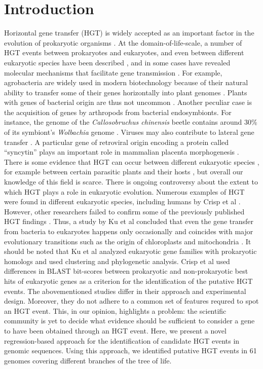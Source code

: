 \section{Introduction}
\label{intro}
Horizontal gene transfer (HGT) is widely accepted as an important factor in the
evolution of prokaryotic organisms \cite{Ochman2000}. At the
domain-of-life-scale, a number of HGT events between prokaryotes and
eukaryotes, and even between different eukaryotic species have been
described \cite{Danchin2016a},
and in some cases have revealed molecular mechanisms that
facilitate gene transmission \cite{Soucy2015}. For example, agrobacteria are
widely used in modern biotechnology because of their natural ability to
transfer some of their genes horizontally into plant genomes
\cite{Chilton1977}. Plants with genes of bacterial origin are thus not uncommon
\cite{Kyndt2015, Matveeva2012, Matveeva2014}. Another peculiar case is the
acquisition of genes by arthropods from bacterial endosymbionts. For instance,
the genome of the \textit{Callosobruchus chinensis} beetle contains around 30\%
of its symbiont's \textit{Wolbachia} genome \cite{Nikoh2008}. Viruses may also
contribute to lateral gene transfer \cite{Drezen2017}. A particular gene of
retroviral origin encoding a protein called ``syncytin'' plays an important
role in mammalian placenta morphogenesis \cite{Mi2000}. There is some evidence
that HGT can occur between different eukaryotic species \cite{Soucy2015}, for
example between certain parasitic plants and their hosts \cite{Yoshida2010,
Xi2012, Zhang2013, Zhang2014}, but overall our knowledge of this field is
scarce. There is ongoing controversy about the extent to which HGT plays a role
in eukaryotic evolution. Numerous examples of HGT were found in different
eukaryotic species, including humans by Crisp et al \cite{Crisp2015}. However,
other researchers failed to confirm some of the previously published HGT
findings \cite{Salzberg2017}. Thus, a study by Ku et al concluded that even the
gene transfer from bacteria to eukaryotes happens only occasionally and
coincides with major evolutionary transitions such as the origin of
chloroplasts and mitochondria \cite{Ku2015}. It should be noted that Ku et al
analyzed eukaryotic gene families with prokaryotic homologs and used clustering
and phylogenetic analysis. Crisp et al used differences in BLAST bit-scores
between prokaryotic and non-prokaryotic best hits of eukaryotic genes as a
criterion for the identification of the putative HGT events. The abovementioned
studies differ in their approach and experimental design. Moreover, they do not
adhere to a common set of features requred to spot an HGT event. This, in our
opinion, highlights a problem: the scientific community is yet to decide what
evidence should be sufficient to consider a gene to have been obtained through
an HGT event. Here, we present a novel regression-based approach for the
identification of candidate HGT events in genomic sequences. Using this
approach, we identified putative HGT events in 61 genomes covering different
branches of the tree of life.
